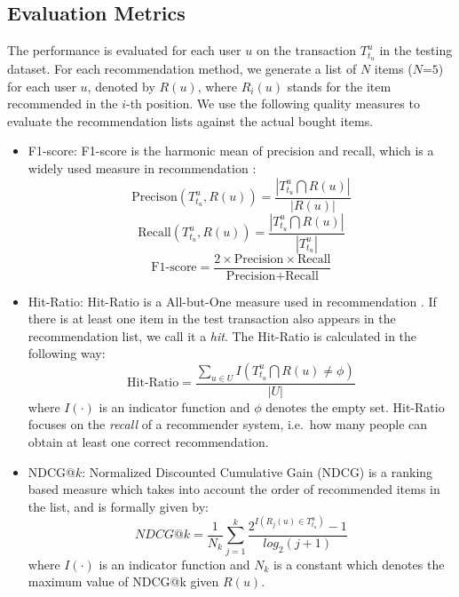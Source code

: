 \documentclass[10pt,journal,compsoc]{IEEEtran}
\begin{document}
\subsection{Evaluation Metrics}
The performance is evaluated for each user $u$ on the transaction $T^u_{t_u}$ in the testing dataset. For each recommendation method, we generate a list of $N$ items ($N$=$5$) for each user $u$, denoted by $R(u)$, where $R_i(u)$ stands for the item recommended in the $i$-th position. We use the following quality measures to evaluate the recommendation lists against the actual bought items.
\begin{itemize}
    \item F1-score: F1-score is the harmonic mean of precision and recall, which is a widely used measure in recommendation \cite{Godoy2005,Lin2002,fpmc}:\\
 \begin{displaymath}
 \text{Precison}(T^u_{t_u},R(u))=\frac{|T^u_{t_u}\bigcap R(u)|}{|R(u)|}
\end{displaymath}
\begin{displaymath}
\text{Recall}(T^u_{t_u},R(u))=\frac{|T^u_{t_u}\bigcap R(u)|}{|T^u_{t_u}|}
\end{displaymath}
\begin{displaymath}
\text{F1-score}=\frac{2\times \text{Precision}\times \text{Recall}}{\text{Precision}+\text{Recall}}
\end{displaymath}
    \item Hit-Ratio: Hit-Ratio is a All-but-One measure used in recommendation \cite{Karypis2001,Xiang2010}. If there is at least one item in the test transaction also appears in the recommendation list, we call it a \textit{hit}. The Hit-Ratio is calculated in the following way:\\
            \begin{displaymath}
            \text{Hit-Ratio}=\frac{\sum_{u\in U}I(T^u_{t_u}\bigcap R(u)\neq \phi)}{|U|}
            \end{displaymath}
    where $I(\cdot)$ is an indicator function and $\phi$ denotes the empty set. Hit-Ratio focuses on the \textit{recall} of a recommender system, i.e.~how many people can obtain at least one correct recommendation.
    \item NDCG@$k$: Normalized Discounted Cumulative Gain (NDCG) is a ranking based measure which takes into account the order of recommended
items in the list\cite{Jaervelin2000}, and is formally given by:\\
    \begin{displaymath}
    NDCG@k=\frac{1}{N_k}\sum_{j=1}^k\frac{2^{I(R_j(u)\in T^u_{t_u})}-1}{log_2(j+1)}
    \end{displaymath}
    where $I(\cdot)$ is an indicator function and $N_k$ is a constant which denotes the maximum value of NDCG@k given $R(u)$.
\end{itemize}
\end{document}

